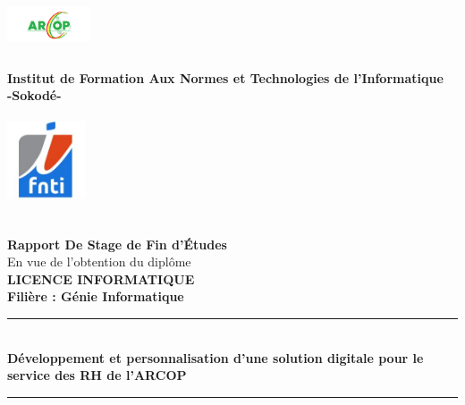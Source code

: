 
\begin{titlepage}
	\begin{center}
		\begin{minipage}{1.5cm}
			\begin{center}
				\includegraphics[width=2.5cm,height=1.7cm]{images/logo/logo-arcop.png}

			\end{center}
		\end{minipage}\hfill
		\begin{minipage}{12cm}
			\begin{center}
				\textbf{ Institut de Formation Aux Normes et Technologies de l'Informatique}\\[0.1cm]
				\textbf{-Sokodé-}

			\end{center}
		\end{minipage}\hfill
		\begin{minipage}{1.5cm}
			\begin{center}
				\includegraphics[width=2.3cm,height=2.5cm]{images/logo/logo-ifnti.png}
			\end{center}

		\end{minipage}
	
		\textsc{\Large }\\[1cm]
		{\large \bfseries Rapport De Stage de Fin d'\uppercase{é}tudes}\\[0.5cm]
		{\large En vue de l'obtention du diplôme}\\[0.5cm]

		{\huge \bfseries \uppercase{Licence Informatique} \\[0.5cm] }
		{\large \bfseries Filière : Génie Informatique}
		\textsc{\Large }\\[1cm]

		\rule{\linewidth}{0.3mm} \\[0.4cm]
		{ \huge \bfseries\color{blue!70!black} Développement et personnalisation d’une solution digitale pour le service des \ac{RH} de l’\ac{ARCOP} \\[0.4cm] }
		\rule{\linewidth}{0.3mm} \\[1cm]


\end{center}
\end{titlepage}
